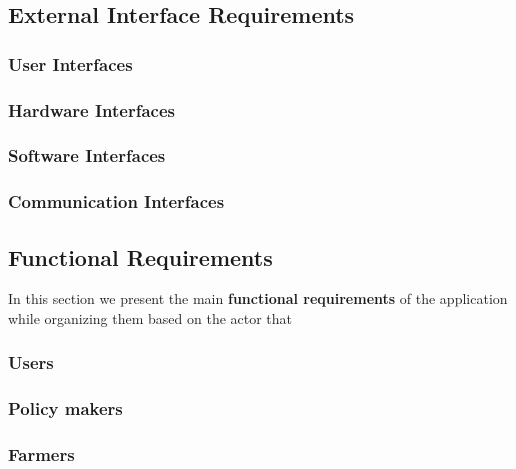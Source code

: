 \subsection{External Interface Requirements}
\subsubsection{User Interfaces}
\vspace{-6mm}

\subsubsection{Hardware Interfaces}

\subsubsection{Software Interfaces}

\subsubsection{Communication Interfaces}


\subsection{Functional Requirements}
In this section we present the main \textbf{functional requirements} of the application while organizing them based on the actor that 

\subsubsection{Users}
\label{sect:users_requirements}


\subsubsection{Policy makers}
\label{sect:policy_maker_requirements}



\subsubsection{Farmers}
\label{sect:farmer_requirements}


